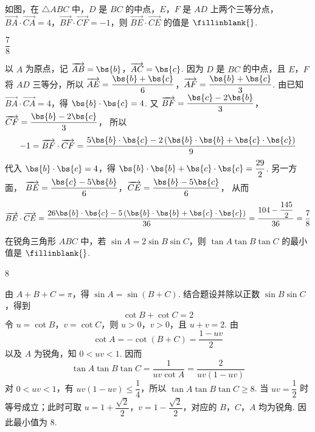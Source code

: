 \begin{problem}
如图，在 \(\triangle ABC\) 中，\(D\) 是 \(BC\) 的中点，\(E\)，\(F\) 是 \(AD\) 上两个三等分点，\(\overrightarrow{BA}\cdot\overrightarrow{CA}=4\)，\(\overrightarrow{BF}\cdot\overrightarrow{CF}=-1\)，则 \(\overrightarrow{BE}\cdot\overrightarrow{CE}\) 的值是 \(\fillinblank{}\).

\end{problem}

\begin{answer}
\(\dfrac78\)
\end{answer}

\begin{solution}
以 \(A\) 为原点，记 \(\overrightarrow{AB}=\bs{b}\)，\(\overrightarrow{AC}=\bs{c}\). 因为 \(D\) 是 \(BC\) 的中点，且 \(E\)，\(F\) 将 \(AD\) 三等分，所以
\(\overrightarrow{AE}=\dfrac{\bs{b}+\bs{c}}{6}\)，\(\overrightarrow{AF}=\dfrac{\bs{b}+\bs{c}}{3}\).
由已知 \(\overrightarrow{BA}\cdot\overrightarrow{CA}=4\)，得 \(\bs{b}\cdot\bs{c}=4\). 又
\(\overrightarrow{BF}=\dfrac{\bs{c}-2\bs{b}}{3}\)，\(\overrightarrow{CF}=\dfrac{\bs{b}-2\bs{c}}{3}\)，
所以
\[
-1=\overrightarrow{BF}\cdot\overrightarrow{CF}
=\dfrac{5\bs{b}\cdot\bs{c}-2\left(\bs{b}\cdot\bs{b}+\bs{c}\cdot\bs{c}\right)}{9}
\]
代入 \(\bs{b}\cdot\bs{c}=4\)，得 \(\bs{b}\cdot\bs{b}+\bs{c}\cdot\bs{c}=\dfrac{29}{2}\). 另一方面，
\(\overrightarrow{BE}=\dfrac{\bs{c}-5\bs{b}}{6}\)，\(\overrightarrow{CE}=\dfrac{\bs{b}-5\bs{c}}{6}\)，
从而
\[
\overrightarrow{BE}\cdot\overrightarrow{CE}
=\dfrac{26\bs{b}\cdot\bs{c}-5\left(\bs{b}\cdot\bs{b}+\bs{c}\cdot\bs{c}\right)}{36}
=\dfrac{104-\dfrac{145}{2}}{36}
=\dfrac78
\]
\end{solution}

\begin{problem}
在锐角三角形 \(ABC\) 中，若 \(\sin A=2\sin B\sin C\)，则 \(\tan A\tan B\tan C\) 的最小值是 \(\fillinblank{}\).
\end{problem}

\begin{answer}
\(8\)
\end{answer}

\begin{solution}
由 \(A+B+C=\pi\)，得 \(\sin A=\sin(B+C)\). 结合题设并除以正数 \(\sin B\sin C\)，得到
\[
\cot B+\cot C=2
\]
令 \(u=\cot B\)，\(v=\cot C\)，则 \(u>0\)，\(v>0\)，且 \(u+v=2\). 由
\[
\cot A=-\cot(B+C)=\dfrac{1-uv}{2}
\]
以及 \(A\) 为锐角，知 \(0<uv<1\). 因而
\[
\tan A\tan B\tan C=\dfrac{1}{uv\cot A}=\dfrac{2}{uv(1-uv)}
\]
对 \(0<uv<1\)，有 \(uv(1-uv)\le\dfrac14\)，所以 \(\tan A\tan B\tan C\ge8\). 当 \(uv=\dfrac12\) 时等号成立；此时可取 \(u=1+\dfrac{\sqrt2}{2}\)，\(v=1-\dfrac{\sqrt2}{2}\)，对应的 \(B\)，\(C\)，\(A\) 均为锐角. 因此最小值为 \(8\).
\end{solution}

